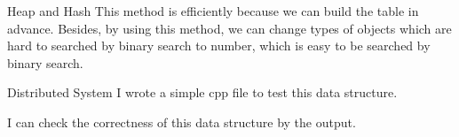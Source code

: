 \begin{homeworkProblem}{Heap and Hash}
        This method is efficiently because we can build the table in advance. 
        Besides, by using this method, we can change types of objects which
        are hard to searched by binary search to number, which is easy to be 
        searched by binary search.
       

        


            

\end{homeworkProblem}

\begin{homeworkProblem}{Distributed System}
        I wrote a simple cpp file to test this data structure. 
        \lstset{breaklines=true}
        
        
        I can check the correctness of this data structure by the output.
        


\end{homeworkProblem}

